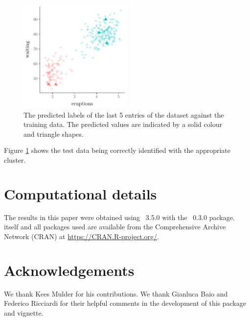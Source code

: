 \documentclass[nojss]{jss}
\begin{document}
\begin{figure}[tb]
\centering
	\includegraphics[width=0.5\textwidth]{img/faithful_pred_plot.pdf}
\caption{The predicted labels of the last 5 entries of the  dataset against the training data. The predicted values are indicated by a solid colour and triangle shapes.}
\label{fig:faithfulpred}
\end{figure}
Figure \ref{fig:faithfulpred} shows the test data being correctly identified with the appropriate cluster.



\section*{Computational details}

The results in this paper were obtained using
~3.5.0 with the
~0.3.0 package.  itself
and all packages used are available from the Comprehensive
 Archive Network (CRAN) at
\url{https://CRAN.R-project.org/}.


\section*{Acknowledgements}
We thank Kees Mulder for his contributions. We thank Gianluca Baio and Federico Ricciardi for their helpful comments in the development of this package and vignette.


\end{document}
